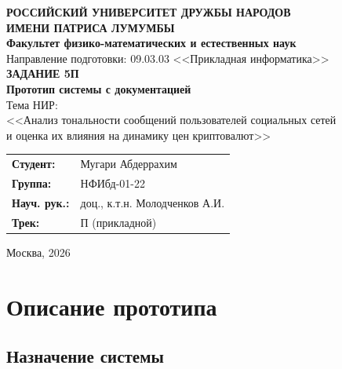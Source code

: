 \documentclass[a4paper,12pt]{article}
\begin{document}

\begin{titlepage}
\begin{center}

\textbf{РОССИЙСКИЙ УНИВЕРСИТЕТ ДРУЖБЫ НАРОДОВ\\ИМЕНИ ПАТРИСА ЛУМУМБЫ}\\[0.3cm]
\textbf{Факультет физико-математических и естественных наук}\\[0.3cm]
Направление подготовки: 09.03.03 <<Прикладная информатика>>\\[2cm]

{\Large \textbf{ЗАДАНИЕ 5П}}\\[0.5cm]
{\large \textbf{Прототип системы с документацией}}\\[1cm]

{\large Тема НИР:}\\[0.3cm]
{\large <<Анализ тональности сообщений пользователей социальных сетей\\
и оценка их влияния на динамику цен криптовалют>>}\\[2cm]

\begin{tabular}{ll}
\textbf{Студент:} & Мугари Абдеррахим \\
\textbf{Группа:} & НФИбд-01-22 \\
\textbf{Науч. рук.:} & доц., к.т.н. Молодченков А.И. \\
\textbf{Трек:} & П (прикладной) \\
\end{tabular}

\vfill
Москва, 2026

\end{center}
\end{titlepage}

\tableofcontents
\newpage


\section{Описание прототипа}

\subsection{Назначение системы}
\end{document}
